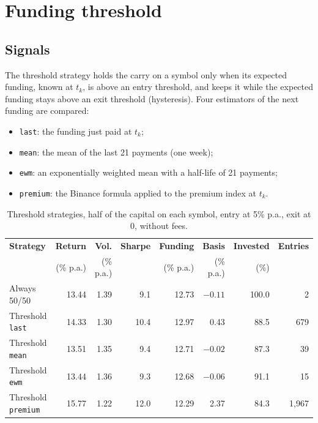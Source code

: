 \documentclass[11pt,a4paper]{article}
\newcommand{\code}[1]{\texttt{#1}}
\begin{document}
\section{Funding threshold}\label{sec:threshold}

\subsection{Signals}
The threshold strategy holds the carry on a symbol only when its expected funding, known at $t_k$, is above an entry
threshold, and keeps it while the expected funding stays above an exit threshold (hysteresis). Four estimators of the
next funding are compared:
\begin{itemize}
\item \code{last}: the funding just paid at $t_k$;
\item \code{mean}: the mean of the last 21 payments (one week);
\item \code{ewm}: an exponentially weighted mean with a half-life of 21 payments;
\item \code{premium}: the Binance formula applied to the premium index at $t_k$.
\end{itemize}

\begin{table}[h]
\centering
\small
\begin{tabular}{@{}lrrrrrrr@{}}
\toprule
\textbf{Strategy} & \textbf{Return} & \textbf{Vol.} & \textbf{Sharpe} & \textbf{Funding} & \textbf{Basis} & \textbf{Invested} & \textbf{Entries} \\
 & (\% p.a.) & (\% p.a.) & & (\% p.a.) & (\% p.a.) & (\%) & \\
\midrule
Always 50/50 & 13.44 & 1.39 & 9.1 & 12.73 & $-0.11$ & 100.0 & 2 \\
Threshold \code{last} & 14.33 & 1.30 & 10.4 & 12.97 & 0.43 & 88.5 & 679 \\
Threshold \code{mean} & 13.51 & 1.35 & 9.4 & 12.71 & $-0.02$ & 87.3 & 39 \\
Threshold \code{ewm} & 13.44 & 1.36 & 9.3 & 12.68 & $-0.06$ & 91.1 & 15 \\
Threshold \code{premium} & 15.77 & 1.22 & 12.0 & 12.29 & 2.37 & 84.3 & 1{,}967 \\
\bottomrule
\end{tabular}
\caption{Threshold strategies, half of the capital on each symbol, entry at 5\% p.a., exit at 0, without fees.}
\label{tab:threshold}
\end{table}
\end{document}
